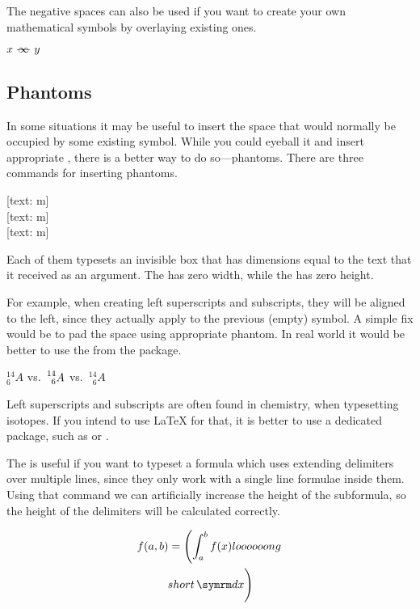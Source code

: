 The negative spaces can also be used if you want to create your own
mathematical symbols by overlaying existing ones.
\begin{example}
\NewDocumentCommand{\myrel}{}{
  \mathrel{
    -\mspace{-11mu}
    \infty{}
    \mspace{-11mu}-
  }
}
\( x \myrel y \)
\end{example}

\subsection{Phantoms}

In some situations it may be useful to insert the space that would normally be
occupied by some existing symbol. While you could eyeball it and insert
appropriate , there is a better way to do so---phantoms. There are
three commands for inserting phantoms.
\begin{lscommand}
  [text: m] \\
  [text: m] \\
  [text: m]
\end{lscommand}
Each of them typesets an invisible box that has dimensions equal to the text
that it received as an argument. The  has zero width, while the
 has zero height.

For example, when creating left superscripts and subscripts, they will be
aligned to the left, since they actually apply to the previous (empty) symbol.
A simple fix would be to pad the space using appropriate phantom. In real world
it would be better to use the  from the  package.
\begin{example}
\( {}^{14}_{6}A \) vs.\
\( \prescript{14}{6}A \) vs.\
\( {}^{14}_{\phantom{1}6}A \)
\end{example}
Left superscripts and subscripts are often found in chemistry, when typesetting
isotopes. If you intend to use \LaTeX{} for that, it is better to use a
dedicated package, such as \pai*{chemformula} or \pai*{mhchem}.

The \csi{vphantom} is useful if you want to typeset a formula which uses
extending delimiters over multiple lines, since they only work with a single
line formulae inside them. Using that command we can artificially increase the
height of the subformula, so the height of the delimiters will be calculated
correctly.
\begin{example}
\begin{multline*}
  f(a, b) = \left(
    \int_a^b f(x)
    loooooong
  \right. \\
  \left.
    \vphantom{
      \int_a^b f(x)
      loooooong
    }
    short \ud x
  \right)
\end{multline*}
\end{example}

